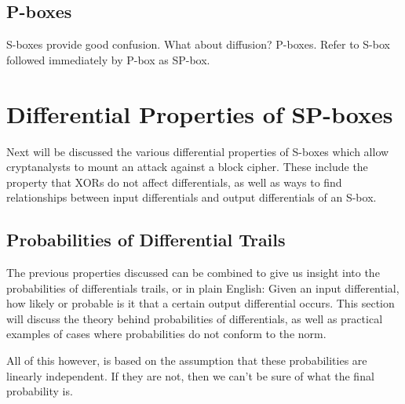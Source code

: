 \subsection{P-boxes}
S-boxes provide good confusion. What about diffusion? P-boxes.
Refer to S-box followed immediately by P-box as SP-box.

\section{Differential Properties of SP-boxes}
Next will be discussed the various differential properties of S-boxes which
allow cryptanalysts to mount an attack against a block cipher.  These include
the property that XORs do not affect differentials, as well as ways to find
relationships between input differentials and output differentials of an S-box.



\subsection{Probabilities of Differential Trails}
The previous properties discussed can be combined to give us insight into the
probabilities of differentials trails, or in plain English: Given an input
differential, how likely or probable is it that a certain output differential
occurs. This section will discuss the theory behind probabilities of
differentials, as well as practical examples of cases where probabilities do
not conform to the norm. 

All of this however, is based on the assumption that these probabilities are
linearly independent. If they are not, then we can't be sure of what the
final probability is.

